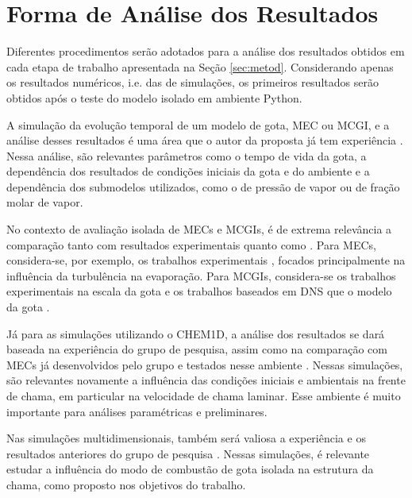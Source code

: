 
\section{Forma de Análise dos Resultados} \label{sec:resultados}

Diferentes procedimentos serão adotados para a análise dos resultados obtidos em cada etapa de trabalho apresentada na Seção \ref{sec:metod}.
Considerando apenas os resultados numéricos, i.e. das de simulações, os primeiros resultados serão obtidos após o teste do modelo isolado em ambiente Python. 

A simulação da evolução temporal de um modelo de gota, MEC ou MCGI, e a análise desses resultados é uma área que o autor da proposta já tem experiência \cite{HenningsJ2024MT}. 
Nessa análise, são relevantes parâmetros como o tempo de vida da gota, a dependência dos resultados de condições iniciais da gota e do ambiente e a dependência dos submodelos utilizados, como o de pressão de vapor ou de fração molar de vapor.

No contexto de avaliação isolada de MECs e MCGIs, é de extrema relevância a comparação tanto com resultados experimentais quanto como .
Para MECs, considera-se, por exemplo, os trabalhos experimentais \cite{BiroukM2006,PatelU2019,KayaEyiceD2024,ArabkhalajA2024,MaquaC2008}, focados principalmente na influência da turbulência na evaporação.
Para MCGIs, considera-se os trabalhos experimentais na escala da gota \cite{ChoS1990SCI,CandelS1999,ChenG1996CF,Xu2002,BiroukM2000,CuociA2005,SetyawanH2015} e os trabalhos baseados em DNS que  o modelo da gota \cite{Stauch2006,CuociA2005,ChoS1990SCI,KazakovA2003CF,MarcheseA1996CF,WangW2024}.

Já para as simulações utilizando o CHEM1D, a análise dos resultados se dará baseada na experiência do grupo de pesquisa, assim como na comparação com MECs já desenvolvidos pelo grupo e testados nesse ambiente \cite{SacomanoF2018CTM,SacomanoF2019IJHMT,SacomanoF2021Fluids,SacomanoF2024CF,SacomanoF2025CF}.
Nessas simulações, são relevantes novamente a influência das condições iniciais e ambientais na frente de chama, em particular na velocidade de chama laminar.
Esse ambiente é muito importante para análises paramétricas e preliminares.

Nas simulações multidimensionais, também será valiosa a experiência e os resultados anteriores do grupo de pesquisa \cite{SacomanoF2017CF,SacomanoF2020CF}.
Nessas simulações, é relevante estudar a influência do modo de combustão de gota isolada na estrutura da chama, como proposto nos objetivos do trabalho.